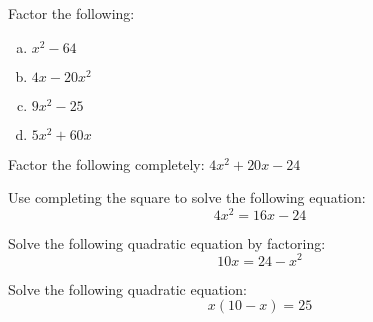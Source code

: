 \documentclass[11pt,letterpaper]{article}
\begin{document}
\newpage



 Factor the following:
	\begin{enumerate}[(a)]
	\item $x^2 - 64$
	\item $4x - 20x^2$
	\item $9x^2 - 25$
	\item $5x^2 + 60x$
	\end{enumerate}



\newpage



 Factor the following completely: $4x^2 + 20x - 24$



\newpage



 Use completing the square to solve the following equation:
	\[
	4x^2= 16x - 24
	\]



\newpage



 Solve the following quadratic equation by factoring:
	\[
	10x= 24 - x^2
	\]



\newpage



 Solve the following quadratic equation:
	\[
	x(10 - x)= 25
	\]
\end{document}
